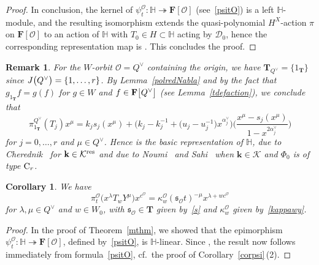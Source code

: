 \documentclass[pdftex]{sigma}
\numberwithin{equation}{section}
\newtheorem{Corollary}[Theorem]{Corollary}
\newtheorem{Remark}[Theorem]{Remark} }
\begin{document}
\begin{proof}
In conclusion, the kernel of $\psi_t^\mathcal{O}\colon \mathbb{H}\twoheadrightarrow\mathbf{F}[\mathcal{O}]$ (see~\eqref{psitO})
is a left $\mathbb{H}$-module, and the resulting isomorphism 
extends the quasi-polynomial $H^X$-action $\pi$ on $\mathbf{F}[\mathcal{O}]$ to an action of $\mathbb{H}$ with $T_0\in H\subset\mathbb{H}$ acting by
$\mathcal{D}_0$, hence the corresponding representation map is . This concludes the proof.
\end{proof}

\begin{Remark}\label{CCpolHH}
For the $W$-orbit $\mathcal{O}=Q^\vee$ containing the origin, we have $\mathbf{T}_{Q^\vee}=\{1_{\mathbf{T}}\}$ since $J\smash{\bigl(Q^\vee\bigr)}=\{1,\dots,r\}$.
By Lemma~\ref{polredNabla} and by the fact that $g_{1_{\mathbf{T}}}f=g(f)$ for $g\in W$ and $f\in\mathbf{F}\smash{\bigl[Q^\vee\bigr]}$ (see Lemma~\ref{tdefaction}),
we conclude that
\[
\pi_{1_{\mathbf{T}}}^{Q^\vee}(T_j)x^\mu=k_js_j(x^\mu)+\bigl(k_j-k_j^{-1}+\bigl(u_j-u_j^{-1}\bigr)x^{\alpha_j^\vee}\bigr)\biggl(\frac{x^\mu-s_j(x^\mu)}{1-x^{2\alpha_j^\vee}}\biggr)
\]
for $j=0,\dots,r$ and $\mu\in Q^\vee$. Hence
 is the basic representation of $\mathbb{H}$, due to Cherednik~\cite{ChKZ2} for $\mathbf{k}\in\mathcal{K}^{{\rm res}}$ and due to Noumi~\cite{No} and Sahi~\cite{Sa} when $\mathbf{k}\in\mathcal{K}$ and $\Phi_0$ is of type ${\rm C}_r$.
\end{Remark}
\begin{Corollary}\label{corindstep}
We have
\[
\pi_t^\mathcal{O}\bigl(x^\lambda T_wY^\mu)x^{c^\mathcal{O}}=\kappa_w^\mathcal{O}(\mathfrak{s}_\mathcal{O}t)^{-\mu}x^{\lambda+wc^\mathcal{O}}
\]
for $\lambda,\mu\in Q^\vee$ and $w\in W_0$, with $\mathfrak{s}_\mathcal{O}\in\mathbf{T}$ given by~\eqref{s} and $\kappa_w^\mathcal{O}$ given by~\eqref{kappawy}.
\end{Corollary}
\begin{proof}
In the proof of Theorem~\ref{mthm}, we showed that the epimorphism
$\psi_t^\mathcal{O}\colon \mathbb{H}\twoheadrightarrow\mathbf{F}[\mathcal{O}]$, defined by~\eqref{psitO}, is $\mathbb{H}$-linear.
Since , the result now follows immediately from formula~\eqref{psitO}, cf.\ the proof of Corollary~\ref{corpsi}\,(2).
\end{proof}
\end{document}
